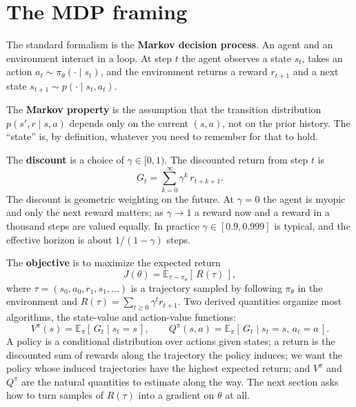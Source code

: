 \section{The MDP framing}\label{sec:mdp}

The standard formalism is the \textbf{Markov decision process}. An agent and
an environment interact in a loop. At step $t$ the agent observes a state
$s_t$, takes an action $a_t \sim \pi_\theta(\cdot \mid s_t)$, and the
environment returns a reward $r_{t+1}$ and a next state $s_{t+1} \sim p(\cdot
\mid s_t, a_t)$.

The \textbf{Markov property} is the assumption that the transition
distribution $p(s', r \mid s, a)$ depends only on the current $(s, a)$, not on
the prior history. The ``state'' is, by definition, whatever you need to
remember for that to hold.

The \textbf{discount} is a choice of $\gamma \in [0, 1)$. The discounted
return from step $t$ is
\[
  G_t = \sum_{k=0}^{\infty} \gamma^k\, r_{t+k+1}.
\]
The discount is geometric weighting on the future. At $\gamma = 0$ the agent
is myopic and only the next reward matters; as $\gamma \to 1$ a reward now and
a reward in a thousand steps are valued equally. In practice $\gamma \in [0.9,
0.999]$ is typical, and the effective horizon is about $1 / (1 - \gamma)$
steps.

The \textbf{objective} is to maximize the expected return
\[
  J(\theta) = \mathbb{E}_{\tau \sim \pi_\theta}\!\left[\, R(\tau) \,\right],
\]
where $\tau = (s_0, a_0, r_1, s_1, \ldots)$ is a trajectory sampled by
following $\pi_\theta$ in the environment and $R(\tau) = \sum_{t \ge 0}
\gamma^t r_{t+1}$. Two derived quantities organize most algorithms, the
state-value and action-value functions:
\[
  V^\pi(s) = \mathbb{E}_\pi[\,G_t \mid s_t = s\,],
  \qquad
  Q^\pi(s, a) = \mathbb{E}_\pi[\,G_t \mid s_t = s,\, a_t = a\,].
\]
A policy is a conditional distribution over actions given states; a return is
the discounted sum of rewards along the trajectory the policy induces; we
want the policy whose induced trajectories have the highest expected return;
and $V^\pi$ and $Q^\pi$ are the natural quantities to estimate along the way.
The next section asks how to turn samples of $R(\tau)$ into a gradient on
$\theta$ at all.
